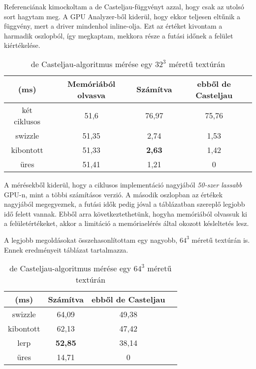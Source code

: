 Referenciának kimockoltam a de Casteljau-függvényt azzal, hogy csak az utolsó sort hagytam meg. A GPU Analyzer-ből kiderül, hogy ekkor teljesen eltűnik a függvény, mert a driver mindenhol inline-olja. Ezt az értéket kivontam a harmadik oszlopból, így megkaptam, mekkora része a futási időnek a felület kiértékelése.

\begin{table}[H]
	\begin{center}
		\begin{tabular}{| c || c || c | c |}
			\hline
			(ms) & \textbf{Memóriából olvasva} & \textbf{Számítva} & \textbf{ebből de Casteljau} \\ 
			\hline\hline
			két ciklusos & 51,6 & 76,97	& 75,76 \\
			\hline
			swizzle	& 51,35	& 2,74 & 1,53 \\
			\hline
			kibontott & 51,33 & \textbf{2,63} & 1,42 \\
			\hline
			üres & 51,41 & 1,21	& 0 \\
			\hline
		\end{tabular}
	\end{center}
	\caption{de Casteljau-algoritmus mérése egy $32^3$ méretű textúrán}
	\label{tab:deCasteljau}
\end{table}

A mérésekből kiderül, hogy a ciklusos implementáció nagyjából \emph{50-szer lassabb} GPU-n, mint a többi számításos verzió. A második oszlopban az értékek nagyjából megegyeznek, a futási idők pedig jóval a táblázatban szereplő legjobb idő felett vannak. Ebből arra következtethetünk, hogyha memóriából olvassuk ki a felületértékeket, akkor a limitáció a memóriaelérés által okozott késleltetés lesz.

A legjobb megoldásokat összehasonlítottam egy nagyobb, $64^3$ méretű textúrán is. Ennek eredményeit  táblázat tartalmazza.

\begin{table}[H]
	\begin{center}
		\begin{tabular}{| c || c || c | c |}
			\hline
			(ms) & \textbf{Számítva} & \textbf{ebből de Casteljau} \\ 
			\hline\hline
			swizzle & 64,09 & 49,38 \\
			\hline
			kibontott & 62,13 & 47,42 \\
			\hline
			lerp & \textbf{52,85} & 38,14 \\
			\hline
			üres & 14,71 & 0 \\
			\hline
		\end{tabular}
	\end{center}
	\caption{de Casteljau-algoritmus mérése egy $64^3$ méretű textúrán}
	\label{tab:deCasteljau2}
\end{table}

